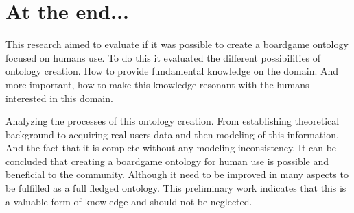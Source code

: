 \section{At the end...}

This research aimed to evaluate if it was possible to create a boardgame ontology focused on humans use. To do this it evaluated the different possibilities of ontology creation. How to provide fundamental knowledge on the domain. And more important, how to make this knowledge resonant with the humans interested in this domain.

Analyzing the processes of this ontology creation. From establishing theoretical background to acquiring real users data and then modeling of this information. And the fact that it is complete without any modeling inconsistency. It can be concluded that creating a boardgame ontology for human use is possible and beneficial to the community. Although it need to be improved in many aspects to be fulfilled as a full fledged ontology. This preliminary work indicates that this is a valuable form of knowledge and should not be neglected. 